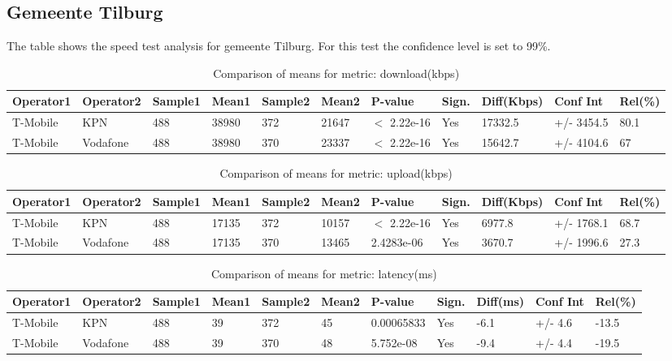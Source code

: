 \documentclass[]{article}
\begin{document}
\normalsize

\newpage

\subsection{Gemeente Tilburg}\label{gemeente-tilburg}

The table shows the speed test analysis for gemeente Tilburg. For this
test the confidence level is set to 99\%.

\begin{table}[ht]
\centering
{\footnotesize
\begin{tabular}{lllllllllll}
  \hline
Operator1 & Operator2 & Sample1 & Mean1 & Sample2 & Mean2 & P-value & Sign. & Diff(Kbps) & Conf Int & Rel(\%) \\ 
  \hline
T-Mobile & KPN & 488 & 38980 & 372 & 21647 & $<$ 2.22e-16 & Yes & 17332.5 & +/- 3454.5 & 80.1 \\ 
  T-Mobile & Vodafone & 488 & 38980 & 370 & 23337 & $<$ 2.22e-16 & Yes & 15642.7 & +/- 4104.6 & 67 \\ 
   \hline
\end{tabular}
}
\caption{Comparison of means for metric: download(kbps)} 
\end{table}

\begin{table}[ht]
\centering
{\footnotesize
\begin{tabular}{lllllllllll}
  \hline
Operator1 & Operator2 & Sample1 & Mean1 & Sample2 & Mean2 & P-value & Sign. & Diff(Kbps) & Conf Int & Rel(\%) \\ 
  \hline
T-Mobile & KPN & 488 & 17135 & 372 & 10157 & $<$ 2.22e-16 & Yes & 6977.8 & +/- 1768.1 & 68.7 \\ 
  T-Mobile & Vodafone & 488 & 17135 & 370 & 13465 & 2.4283e-06 & Yes & 3670.7 & +/- 1996.6 & 27.3 \\ 
   \hline
\end{tabular}
}
\caption{Comparison of means for metric: upload(kbps)} 
\end{table}

\begin{table}[ht]
\centering
{\footnotesize
\begin{tabular}{lllllllllll}
  \hline
Operator1 & Operator2 & Sample1 & Mean1 & Sample2 & Mean2 & P-value & Sign. & Diff(ms) & Conf Int & Rel(\%) \\ 
  \hline
T-Mobile & KPN & 488 & 39 & 372 & 45 & 0.00065833 & Yes & -6.1 & +/- 4.6 & -13.5 \\ 
  T-Mobile & Vodafone & 488 & 39 & 370 & 48 & 5.752e-08 & Yes & -9.4 & +/- 4.4 & -19.5 \\ 
   \hline
\end{tabular}
}
\caption{Comparison of means for metric: latency(ms)} 
\end{table}
\end{document}
